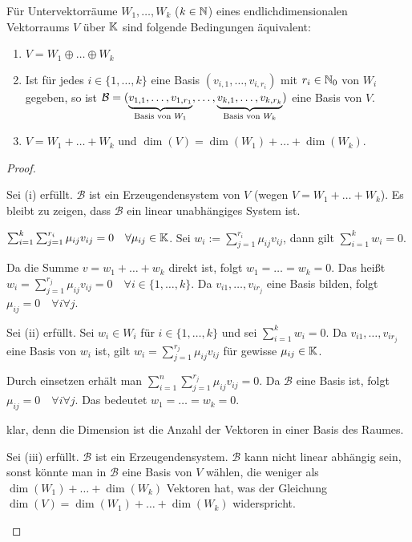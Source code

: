 \begin{thm}
	Für Untervektorräume $ W_1, \ldots, W_k $ ($ k \in \mathbb N $) eines endlichdimensionalen Vektorraums $ V $ über $ \mathbb K $ sind folgende Bedingungen äquivalent:
	\begin{enumerate}
		\item $ V = W_1 \oplus \ldots \oplus W_k $
		\item Ist für jedes $ i \in \{ 1, \ldots, k \} $ eine Basis $ (v_{i,1}, \ldots, v_{i,r_i}) $ mit $ r_i \in \mathbb N_0 $ von $ W_i $ gegeben, so ist $ \mathcal{B} = (\underbrace{v_{1,1}, \ldots, v_{1,r_1}}_{\text{Basis von $ W_1 $}}, \ldots, \underbrace{v_{k,1}, \ldots, v_{k,r_k}}_{\text{Basis von $ W_k $}}) $ eine Basis von $ V $.
		\item $ V = W_1 + \ldots + W_k $ und $ \dim(V) = \dim(W_1) + \ldots + \dim(W_k) $.
	\end{enumerate}
\end{thm}
\begin{proof} 
\begin{description}[font=\normalfont]
	\item[(i)$ \Rightarrow $(ii):]
	Sei (i) erfüllt. $ \mathcal{B} $ ist ein Erzeugendensystem von $ V $ (wegen $ V = W_1 + \ldots + W_k $). Es bleibt zu zeigen, dass $ \mathcal{B} $ ein linear unabhängiges System ist.
	
	
	$ \sum_{i=1}^{k} \sum_{j=1}^{r_i} \mu_{ij} v_{ij} = 0 \quad \forall \mu_{ij} \in \mathbb K $. Sei $ w_i := \sum_{j=1}^{r_i}  \mu_{ij} v_{ij} $, dann gilt $ \sum_{i=1}^{k} w_i = 0 $.
	
	Da die Summe $ v = w_1 + \ldots + w_k $ direkt ist, folgt $ w_1 = \ldots = w_k = 0 $. Das heißt $ w_i = \sum_{j=1}^{r_j} \mu_{ij} v_{ij} = 0 \quad \forall i \in \{1, \ldots, k \} $. Da $ v_{i1}, \ldots, v_{ir_j} $ eine Basis bilden, folgt $ \mu_{ij} = 0 \quad \forall i \forall j $.
	
	\item[(ii)$ \Rightarrow $(i):]
	Sei (ii) erfüllt.
	Sei $ w_i \in W_i $ für $ i \in \{1,\ldots,k\} $ und sei $ \sum_{i = 1}^{k} w_i = 0 $. Da $ v_{i1}, \ldots, v_{ir_j} $ eine Basis von $ w_i $ ist, gilt $ w_i = \sum_{j = 1}^{r_j} \mu_{ij} v_{ij} $ für gewisse $ \mu_{ij} \in \mathbb K $.
	
	Durch einsetzen erhält man $ \sum_{i = 1}^{n} \sum_{j = 1}^{r_j} \mu_{ij} v_{ij} = 0  $. Da $ \mathcal{B} $ eine Basis ist, folgt $ \mu_{ij} = 0 \quad \forall i \forall j $. Das bedeutet $ w_1 = \ldots = w_k = 0 $.
	
	\item[(ii)$ \Rightarrow $(iii):]
	klar, denn die Dimension ist die Anzahl der Vektoren in einer Basis des Raumes.
	
	\item[(iii)$ \Rightarrow $(ii):]
	Sei (iii) erfüllt.
	$ \mathcal{B} $ ist ein Erzeugendensystem. $ \mathcal{B} $ kann nicht linear abhängig sein, sonst könnte man in $ \mathcal{B} $ eine Basis von $ V $ wählen, die weniger als $ \dim(W_1) + \ldots + \dim(W_k) $ Vektoren hat, was der Gleichung $ \dim(V) = \dim(W_1) + \ldots + \dim(W_k) $ widerspricht. \qedhere
\end{description}
\end{proof}

